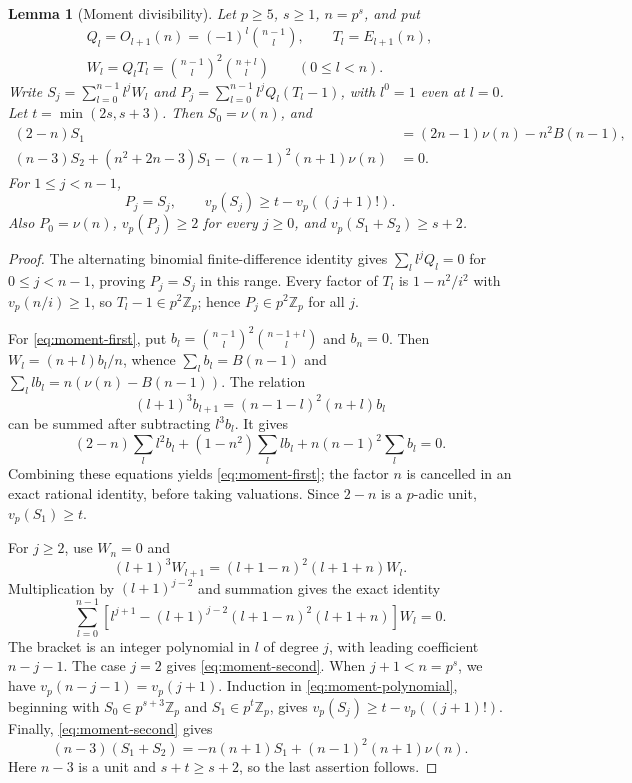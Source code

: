 \documentclass[11pt]{amsart}
\newtheorem{lemma}[theorem]{Lemma}
\theoremstyle{definition}
\theoremstyle{remark}
\begin{document}
\begin{lemma}[Moment divisibility]\label{lem:moment-unit}
Let $p\ge5$, $s\ge1$, $n=p^s$, and put
\begin{gather*}
Q_l=O_{l+1}(n)=(-1)^l\binom{n-1}{l},\qquad T_l=E_{l+1}(n),\\
W_l=Q_lT_l=\binom{n-1}{l}^{\!2}\binom{n+l}{l}\qquad(0\le l<n).
\end{gather*}
Write $S_j=\sum_{l=0}^{n-1}l^jW_l$ and
$P_j=\sum_{l=0}^{n-1}l^jQ_l(T_l-1)$, with $l^0=1$ even at $l=0$.
Let $t=\min(2s,s+3)$. Then $S_0=\nu(n)$, and
\begin{align}
 (2-n)S_1&=(2n-1)\nu(n)-n^2B(n-1),\label{eq:moment-first}\\
 (n-3)S_2+(n^2+2n-3)S_1-(n-1)^2(n+1)\nu(n)&=0.\label{eq:moment-second}
\end{align}
For $1\le j<n-1$,
\[
 P_j=S_j,\qquad v_p(S_j)\ge t-v_p((j+1)!).
\]
Also $P_0=\nu(n)$, $v_p(P_j)\ge2$ for every $j\ge0$, and
$v_p(S_1+S_2)\ge s+2$.
\end{lemma}
\begin{proof}
The alternating binomial finite-difference identity gives
$\sum_l l^jQ_l=0$ for $0\le j<n-1$, proving $P_j=S_j$ in this range.
Every factor of $T_l$ is $1-n^2/i^2$ with $v_p(n/i)\ge1$, so
$T_l-1\in p^2\mathbb Z_p$; hence $P_j\in p^2\mathbb Z_p$ for all $j$.

For \eqref{eq:moment-first}, put
$b_l=\binom{n-1}{l}^2\binom{n-1+l}{l}$ and $b_n=0$.
Then $W_l=(n+l)b_l/n$, whence
$\sum_l b_l=B(n-1)$ and $\sum_l l b_l=n(\nu(n)-B(n-1))$.
The relation
\[
(l+1)^3b_{l+1}=(n-1-l)^2(n+l)b_l
\]
can be summed after subtracting $l^3b_l$. It gives
\[
(2-n)\sum_l l^2b_l+(1-n^2)\sum_l l b_l+n(n-1)^2\sum_l b_l=0.
\]
Combining these equations yields \eqref{eq:moment-first}; the factor $n$ is
cancelled in an exact rational identity, before taking valuations. Since
$2-n$ is a $p$-adic unit, $v_p(S_1)\ge t$.

For $j\ge2$, use $W_n=0$ and
\[
(l+1)^3W_{l+1}=(l+1-n)^2(l+1+n)W_l.
\]
Multiplication by $(l+1)^{j-2}$ and summation gives the exact identity
\begin{equation}\label{eq:moment-polynomial}
\sum_{l=0}^{n-1}
\left[l^{j+1}-(l+1)^{j-2}(l+1-n)^2(l+1+n)\right]W_l=0.
\end{equation}
The bracket is an integer polynomial in $l$ of degree $j$, with leading
coefficient $n-j-1$. The case $j=2$ gives \eqref{eq:moment-second}.
When $j+1<n=p^s$, we have
$v_p(n-j-1)=v_p(j+1)$. Induction in \eqref{eq:moment-polynomial}, beginning
with $S_0\in p^{s+3}\mathbb Z_p$ and $S_1\in p^t\mathbb Z_p$, gives
$v_p(S_j)\ge t-v_p((j+1)!)$.
Finally, \eqref{eq:moment-second} gives
\[
(n-3)(S_1+S_2)=-n(n+1)S_1+(n-1)^2(n+1)\nu(n).
\]
Here $n-3$ is a unit and $s+t\ge s+2$, so the last assertion follows.
\end{proof}
\end{document}
